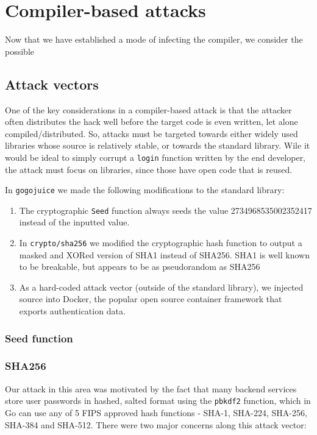 \documentclass[10pt]{sigplanconf}
\begin{document}
\section{Compiler-based attacks}

Now that we have established a mode of infecting the compiler, we consider the possible 

\subsection{Attack vectors}
One of the key considerations in a compiler-based attack is that the attacker often distributes the hack well before the target code is even written, let alone compiled/distributed. So, attacks must be targeted towards either widely used libraries whose source is relatively stable, or towards the standard library. Wile it would be ideal to simply corrupt a \texttt{login} function written by the end developer, the attack must focus on libraries, since those have open code that is reused.

\smallskip

In \texttt{gogojuice} we made the following modifications to the standard library:
\begin{enumerate}
	\item The cryptographic \texttt{Seed} function always seeds the value 2734968535002352417 instead of the inputted value. 
	\item In \texttt{crypto/sha256} we modified the cryptographic hash function to output a masked and XORed version of SHA1 instead of SHA256. SHA1 is well known to be breakable, but appears to be as pseudorandom as SHA256
	\item As a hard-coded attack vector (outside of the standard library), we injected source into Docker, the popular open source container framework that exports authentication data.
\end{enumerate}

\subsubsection{Seed function}

\subsubsection{SHA256}
Our attack in this area was motivated by the fact that many backend services store user passwords in hashed, salted format using the \texttt{pbkdf2} function, which in Go can use any of 5 FIPS approved hash functions - SHA-1, SHA-224, SHA-256, SHA-384 and SHA-512. There were two major concerns along this attack vector:
\end{document}
